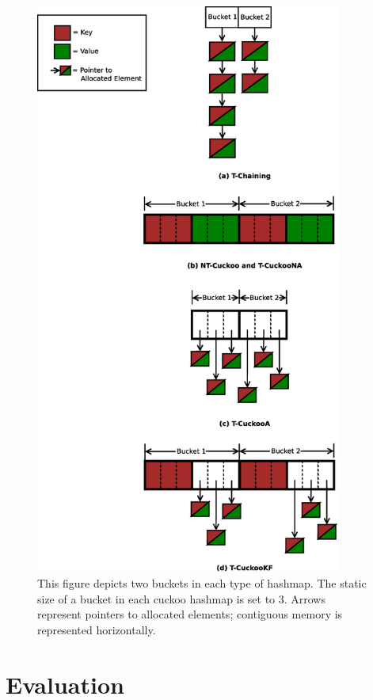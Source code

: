 \begin{figure}[H]
\centering
\includegraphics[width=0.9\textwidth]{hashmap_finds}
    \caption[Bucket Structure of Different Hashmaps]{This figure depicts two buckets in each type of hashmap. The static size of a bucket in each cuckoo hashmap is set to 3. Arrows represent pointers to allocated elements; contiguous memory is represented horizontally.}
\label{fig:hashmap_buckets}
\end{figure}


\section{Evaluation}

